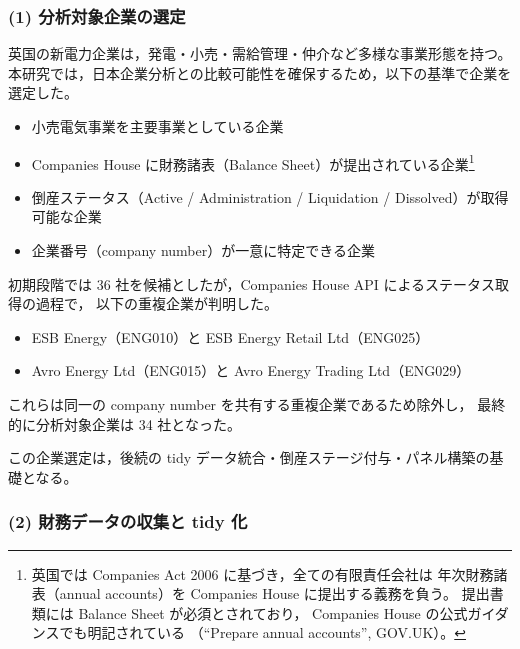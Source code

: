 
\subsubsection{(1) 分析対象企業の選定}

英国の新電力企業は，発電・小売・需給管理・仲介など多様な事業形態を持つ。
本研究では，日本企業分析との比較可能性を確保するため，以下の基準で企業を選定した。

\begin{itemize}
    \item 小売電気事業を主要事業としている企業
    \item Companies House に財務諸表（Balance Sheet）が提出されている企業\footnote{
    英国では Companies Act 2006 に基づき，全ての有限責任会社は
    年次財務諸表（annual accounts）を Companies House に提出する義務を負う。
    提出書類には Balance Sheet が必須とされており，
    Companies House の公式ガイダンスでも明記されている
    （“Prepare annual accounts”, GOV.UK）。
    }
    \item 倒産ステータス（Active / Administration / Liquidation / Dissolved）が取得可能な企業
    \item 企業番号（company number）が一意に特定できる企業
\end{itemize}

初期段階では 36 社を候補としたが，Companies House API によるステータス取得の過程で，
以下の重複企業が判明した。

\begin{itemize}
    \item ESB Energy（ENG010）と ESB Energy Retail Ltd（ENG025）
    \item Avro Energy Ltd（ENG015）と Avro Energy Trading Ltd（ENG029）
\end{itemize}

これらは同一の company number を共有する重複企業であるため除外し，
最終的に分析対象企業は 34 社となった。

この企業選定は，後続の tidy データ統合・倒産ステージ付与・パネル構築の基礎となる。


\subsubsection{(2) 財務データの収集と tidy 化}

